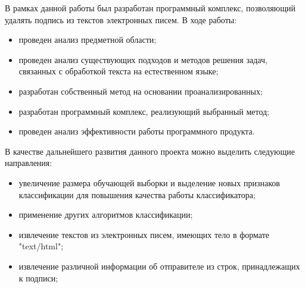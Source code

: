 \Conclusion %

В рамках данной работы был разработан программный комплекс, позволяющий удалять подпись из текстов электронных писем.
В ходе работы:

\begin{itemize}
	\item проведен анализ предметной области;
	\item проведен анализ существующих подходов и методов решения задач, связанных с обработкой текста на естественном языке;
	\item разработан собственный метод на основании проанализированных;
	\item разработан программный комплекс, реализующий выбранный метод;
	\item проведен анализ эффективности работы программного продукта.
\end{itemize}

В качестве дальнейшего развития данного проекта можно выделить следующие направления:

\begin{itemize}
	\item увеличение размера обучающей выборки и выделение новых признаков классификации для повышения качества работы классификатора;
	\item применение других алгоритмов классификации;
	\item извлечение текстов из электронных писем, имеющих тело в формате "text/html";
	\item извлечение различной информации об отправителе из строк, принадлежащих к подписи;
\end{itemize} 


